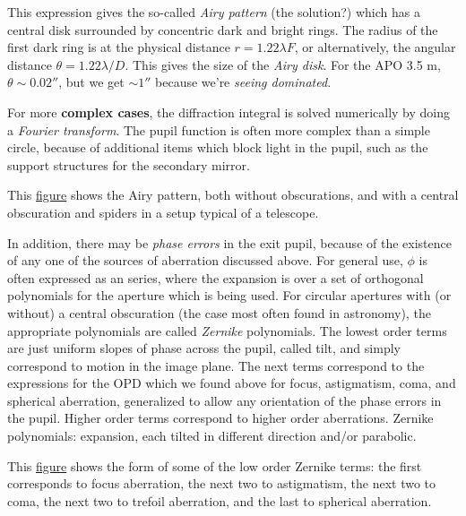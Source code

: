 \documentclass[12pt]{article}
\newcommand{\mynotes}[1]{\textcolor{myBlue}{#1}}
\begin{document}
This expression gives the so-called \textit{Airy pattern}
\mynotes{(the solution?)}
which has a central disk surrounded by concentric dark and bright rings. The
radius of the first dark ring is at the physical distance $r = 1.22\lambda F$,
or alternatively, the angular distance $\theta = 1.22\lambda/D$. This gives the
size of the \textit{Airy disk}.
\mynotes{For the APO 3.5 m, $\theta \sim 0.02''$, but we get $\sim 1''$
because we're \textit{seeing dominated}.}

For more \textbf{complex cases}, the diffraction integral is solved numerically
by doing a \textit{Fourier transform}. The pupil function is often more complex
than a simple circle, because of additional items which block light in the
pupil, such as the support structures for the secondary mirror.

This \href{http://astronomy.nmsu.edu/holtz/a535/html/diagrams/a535/airy.htm}
{figure} shows the Airy pattern, both without obscurations,
and with a central obscuration and spiders in a setup typical of a telescope.

In addition, there may be \textit{phase errors} in the exit pupil, because of
the existence of any one of the sources of aberration discussed above. For
general use, $\phi$ is often expressed as an series, where the expansion is
over a set of orthogonal polynomials for the aperture which is being used. For
circular apertures with (or without) a central obscuration (the case most often
found in astronomy), the appropriate polynomials are called \textit{Zernike}
polynomials. The lowest order terms are just uniform slopes of phase across the
pupil, called tilt, and simply correspond to motion in the image plane. The
next terms correspond to the expressions for the OPD which we found above for
focus, astigmatism, coma, and spherical aberration, generalized to allow any
orientation of the phase errors in the pupil. Higher order terms correspond to
higher order aberrations. \mynotes{Zernike polynomials: expansion, each tilted
in different direction and/or parabolic}.

This \href{http://astronomy.nmsu.edu/holtz/a535/html/diagrams/a535/zernike.htm}
{figure} shows the form of some of the low order Zernike terms: the first
corresponds to focus aberration, the next two to astigmatism, the next two to
coma, the next two to trefoil aberration, and the last to spherical aberration.
\end{document}
